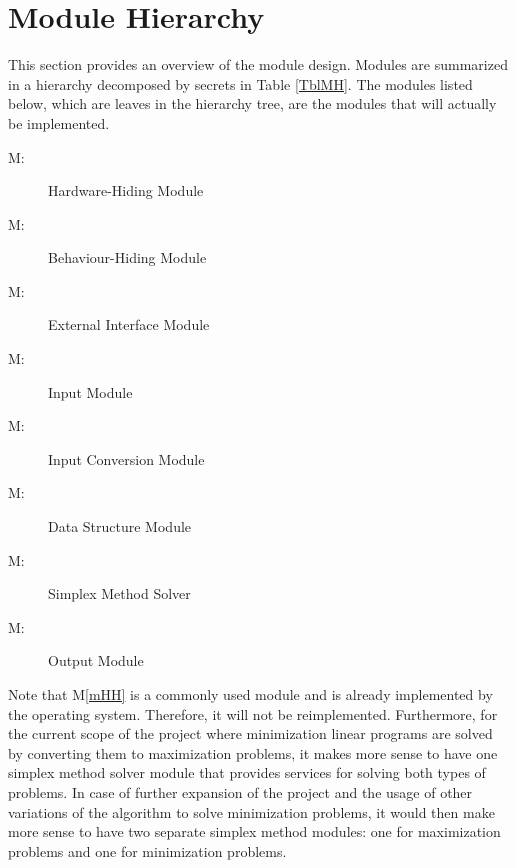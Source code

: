 \documentclass[12pt, titlepage]{article}
\newcounter{mnum}
\newcommand{\mthemnum}{M\themnum}
\newcommand{\mref}[1]{M\ref{#1}}
\begin{document}
\section{Module Hierarchy} \label{SecMH}

This section provides an overview of the module design. Modules are summarized
in a hierarchy decomposed by secrets in Table \ref{TblMH}. The modules listed
below, which are leaves in the hierarchy tree, are the modules that will
actually be implemented.

\begin{description}
\item [ \mthemnum \label{mHH}:] Hardware-Hiding Module
\item [ \mthemnum \label{mBH}:] Behaviour-Hiding Module
\item [ \mthemnum \label{mEI}:] External Interface Module
\item [ \mthemnum \label{mInput}:] Input Module
\item [ \mthemnum \label{mIC}:] Input Conversion Module
\item [ \mthemnum \label{mDataStructure}:] Data Structure 
Module
\item [ \mthemnum \label{mSimplex}:] Simplex Method Solver
\item [ \mthemnum \label{mOutput}:] Output Module
\end{description}

Note that \mref{mHH} is a commonly used module and is already implemented by 
the operating system. Therefore, it will not be reimplemented. Furthermore, for 
the current scope of the project where minimization linear programs are solved 
by converting them to maximization problems, it makes more sense to have one 
simplex method solver module that provides services for solving both types of 
problems. In case of further expansion of the project and the usage of other 
variations of the algorithm to solve minimization problems, it would then make 
more sense to have two separate simplex method modules: one for maximization 
problems and one for minimization problems.
\end{document}

